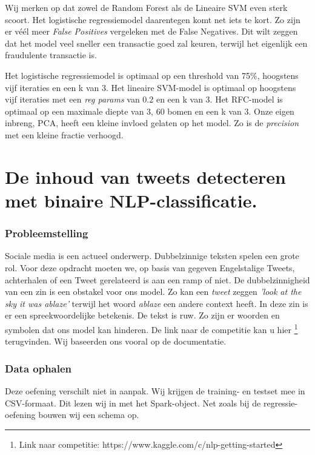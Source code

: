 \documentclass[a4paper,10pt,twoside]{report}
\begin{document}
Wij merken op dat zowel de Random Forest als de Lineaire SVM even sterk scoort. Het logistische regressiemodel daarentegen komt net iets te kort. Zo zijn er véél meer \textit{False Positives} vergeleken met de {False Negatives}. Dit wilt zeggen dat het model veel sneller een transactie goed zal keuren, terwijl het eigenlijk een fraudulente transactie is.

Het logistische regressiemodel is optimaal op een threshold van 75\%, hoogstens vijf iteraties en een k van 3. Het lineaire SVM-model is optimaal op hoogstens vijf iteraties met een \textit{reg params} van 0.2 en een k van 3. Het RFC-model is optimaal op een maximale diepte van 3, 60 bomen en een k van 3. Onze eigen inbreng, PCA, heeft een kleine invloed gelaten op het model. Zo is de \textit{precision} met een kleine fractie verhoogd. 

\chapter{De inhoud van tweets detecteren met binaire NLP-classificatie.}

\subsection*{Probleemstelling}

Sociale media is een actueel onderwerp. Dubbelzinnige teksten spelen een grote rol. Voor deze opdracht moeten we, op basis van gegeven Engelstalige Tweets, achterhalen of een Tweet gerelateerd is aan een ramp of niet. De dubbelzinnigheid van een zin is een obstakel voor ons model. Zo kan een \textit{tweet} zeggen \textit{'look at the sky it was ablaze'} terwijl het woord \textit{ablaze} een andere context heeft. In deze zin is er een spreekwoordelijke betekenis. De tekst is ruw. Zo zijn er woorden en symbolen dat ons model kan hinderen. De link naar de competitie kan u hier \footnote{Link naar competitie: https://www.kaggle.com/c/nlp-getting-started} terugvinden. Wij baseerden ons vooral op de documentatie.

\subsection*{Data ophalen}

Deze oefening verschilt niet in aanpak. Wij krijgen de training- en testset mee in CSV-formaat. Dit lezen wij in met het Spark-object. Net zoals bij de regressie-oefening bouwen wij een schema op.
\end{document}
